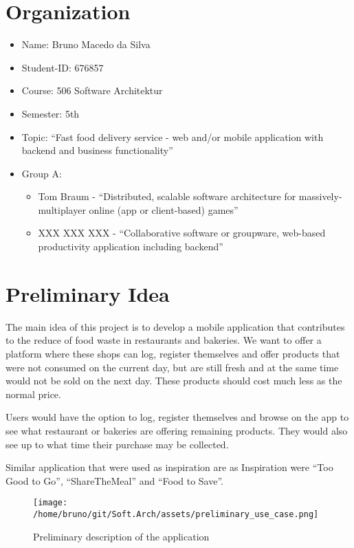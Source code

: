 \documentclass[pdftex, a4paper]{scrartcl}
\begin{document}
\section{Organization}

\begin{itemize}
    \item Name: Bruno Macedo da Silva
    \item Student-ID: 676857
    \item Course: 506 Software Architektur 
    \item Semester: 5th
    \item Topic: ``Fast food delivery service - web and/or mobile application with backend and business functionality''
    \item Group A: 
        \begin{itemize}
            \item Tom Braum - ``Distributed, scalable software architecture for massively-multiplayer online (app or 
            client-based) games''
            \item XXX XXX XXX - ``Collaborative software or groupware, web-based productivity
            application including backend''
        \end{itemize}
\end{itemize}

\section{Preliminary Idea}

The main idea of this project is to develop a mobile application that contributes to the reduce of food waste 
in restaurants and bakeries. We want to offer a platform where these shops can log, register themselves and offer
products that were not consumed on the current day, but are still fresh and at the same time would not be sold on 
the next day. These products should cost much less as the normal price.

Users would have the option to log, register themselves and browse on the app to see what restaurant or bakeries
are offering remaining products. They would also see up to what time their purchase may be collected.

Similar application that were used as inspiration are as Inspiration were ``Too Good to Go'', ``ShareTheMeal'' 
and ``Food to Save''.

\begin{figure}[htb]
    \centering
    \texttt{[image: /home/bruno/git/Soft.Arch/assets/preliminary\_use\_case.png]}
    \caption{Preliminary description of the application}
    \label{fig:predes}
\end{figure}
\end{document}
